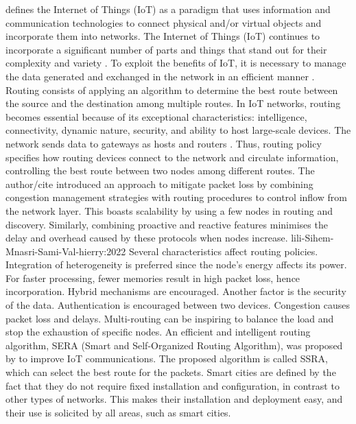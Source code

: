 \cite{plageras-psannis:2017} defines the Internet of Things (IoT) as a paradigm that uses information and communication 
technologies to connect physical and/or virtual objects and incorporate them into networks. The Internet of Things (IoT) 
continues to incorporate a significant number of parts and things that stand out for their complexity and variety 
\cite{amrioui-Sofiane-Hamrioui-Camil-Lloret-Jaime-Lorenz-Pascal:2018}. To exploit the benefits of IoT, it is necessary to manage 
the data generated and exchanged in the network in an efficient manner \cite{Tlili-Sihem-Mnasri-Sami-Val-hierry:2022}. 
Routing consists of applying an algorithm to determine the best route between the source and 
the destination among multiple routes. In IoT networks, routing becomes essential because of its exceptional characteristics: 
intelligence, connectivity, dynamic nature, security, and ability to host large-scale devices. The network sends data to gateways 
as hosts and routers \cite{AlZubi-Al-Maitah-Alarifi:2019}. Thus, routing policy specifies how routing devices connect to 
the network and circulate information, controlling the best route between two nodes among different routes. The author/cite 
introduced an approach to mitigate packet loss by combining congestion management strategies with routing procedures to control
 inflow from the network layer. This boasts scalability by using a few nodes in routing and discovery. Similarly, combining 
 proactive and reactive features minimises the delay and overhead caused by these protocols when nodes increase. 
 lili-Sihem-Mnasri-Sami-Val-hierry:2022 Several characteristics affect routing policies. Integration of heterogeneity is 
 preferred since the node’s energy affects its power. For faster processing, fewer memories result in high packet loss, 
 hence incorporation. Hybrid mechanisms are encouraged. Another factor is the security of the data. Authentication is 
 encouraged between two devices. Congestion causes packet loss and delays. Multi-routing can be inspiring to balance the 
 load and stop the exhaustion of specific nodes. 
 An efficient and intelligent routing algorithm, SERA (Smart and Self-Organized Routing Algorithm), was proposed by 
 \cite{amrioui-Sofiane-Hamrioui-Camil-Lloret-Jaime-Lorenz-Pascal:2018} to improve IoT communications. The proposed algorithm is called SSRA, which can select the best route for the packets. 
 Smart cities are defined by the fact that they do not require fixed installation and configuration, in contrast to other types
  of networks. This makes their installation and deployment easy, and their use is solicited by all areas, such as smart cities.
 
